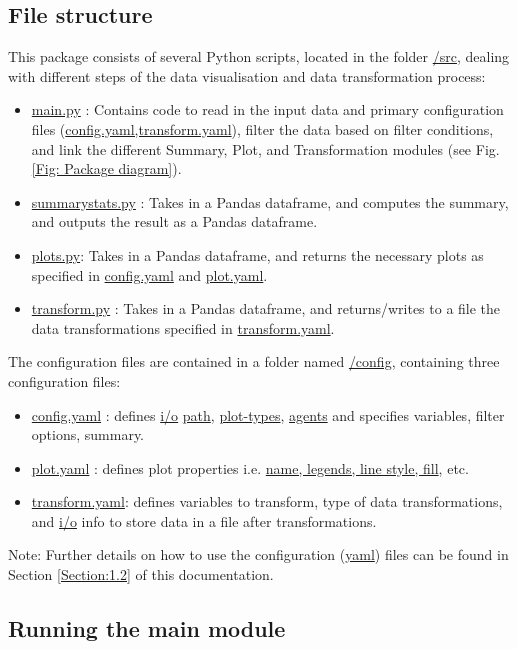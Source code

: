 \documentclass[10pt,a4paper]{article}
\begin{document}
\subsection{File structure}

This package consists of several Python scripts, located in the folder \url{/src}, dealing with different steps of the data visualisation and data transformation process:
\begin{itemize}
\item \url{main.py} : Contains code to read in the input data and primary configuration files (\url{config.yaml,transform.yaml}), filter the data based on filter conditions, and link the different Summary, Plot, and Transformation modules (see Fig. \ref{Fig: Package diagram}).

\item \url{summarystats.py} : Takes in a Pandas dataframe, and computes the summary, and outputs the result as a Pandas dataframe.

\item \url{plots.py}: Takes in a Pandas dataframe, and returns the necessary plots as specified in \url{config.yaml} and \url{plot.yaml}.

\item \url{transform.py} : Takes in a Pandas dataframe, and returns/writes to a file the data transformations specified in \url{transform.yaml}.
\end{itemize}

The configuration files are contained in a folder named \url{/config}, containing three configuration files:
\begin{itemize}
\item \url{config.yaml} : defines \url{i/o} \url{path}, \url{plot-types}, \url{agents} and specifies variables, filter options, summary.

\item \url{plot.yaml} : defines plot properties i.e. \url{name, legends, line style, fill}, etc.

\item \url{transform.yaml}: defines variables to transform, type of data transformations, and \url{i/o} info to store data in a file after transformations.
\end{itemize}

Note: Further details on how to use the configuration (\url{yaml}) files can be found in Section \ref{Section:1.2} of this documentation.

\subsection{Running the main module}
\end{document}

